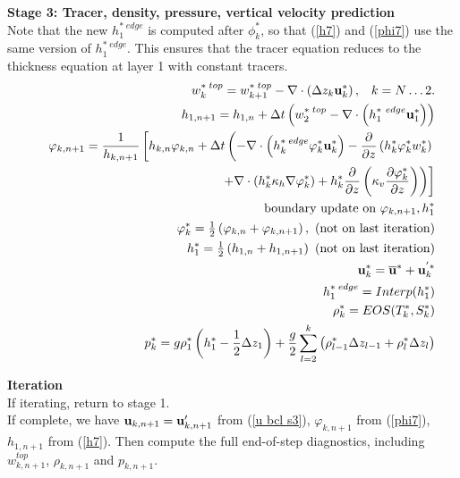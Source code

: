 \documentclass[11pt]{report}
\begin{document}
{\bf Stage 3: Tracer, density, pressure, vertical velocity prediction} \\
Note that the new $h_1^{*\; edge}$ is computed after $\phi^*_k$, so that (\ref{h7}) and (\ref{phi7}) use the same version of $h_1^{*\; edge}$.  This ensures that the tracer equation reduces to the thickness equation at layer 1 with constant tracers.
\begin{eqnarray}   &&
\label{w7}
w^{*\; top}_k 
= w^{*\; top}_{k+1} 
- \nabla \cdot \left( \Delta z_k {\bf u}^{*}_k \right), \;\;\; k=N\ldots 2.
\\&&
\label{h7}
h_{1,n+1} 
= h_{1,n} + \Delta t \left( w^{*\; top}_2     
- \nabla \cdot \left( h^{*\ edge}_1 {\bf u}^*_1 \right) \right)
\\&&
\label{phi7}
{\varphi}_{k,n+1} = \frac{1}{h_{k,n+1}} \left[
h_{k,n} \varphi_{k,n} 
+ \Delta t
\left(  - \nabla \cdot \left( h_k^{*\; edge}\varphi_k^* {\bf u}_k^* \right)  
- \frac{\partial}{\partial z} \left( h_k^*\varphi_k^* w_k^* \right)  
\right.\right.
\\&& \nonumber \hspace{5cm}
\left.\left.
+ \nabla\cdot\left(h_k^* \kappa_h \nabla\varphi_k^* \right)
+ h_k^* \frac{\partial }{\partial z} 
  \left( \kappa_v \frac{\partial \varphi_k^*}{\partial z} \right)
\right) \right]
\\&&
\mbox{boundary update on }{\varphi}_{k,n+1}, h_1^* 
\\&&
\varphi_{k}^* = \textstyle\frac{1}{2}\left(\varphi_{k,n} +\varphi_{k,n+1}\right), 
\mbox{ (not on last iteration)}
\\&&
h_{1}^* = \textstyle\frac{1}{2}\left(h_{1,n} +h_{1,n+1}\right) 
\mbox{ (not on last iteration)}
\\&&
{\bf u}^*_k = \ubtr^* + {\bf u}^{'*}_k 
\\&&
h^{*\; edge}_1 = Interp(h^*_1)
\\&& \label{rho7}
{\rho}_k^* = EOS(T^*_k, S^*_k) 
\\&&
\label{p7}
{p}_k^* =  g {\rho}_1^* \left( h_1^* - \frac{1}{2}\Delta z_1 \right) + 
  \frac{g}{2}\sum_{l=2}^{k} 
\left({\rho}_{l-1}^* \Delta z_{l-1}
+ {\rho}_{l}^* \Delta z_{l} 
\right)
\end{eqnarray}

{\bf Iteration} \\
If iterating, return to stage 1.  \\
If complete, we have ${\bf u}_{k,n+1}= {\bf u}'_{k,n+1}$ from (\ref{u bcl s3}), 
${\varphi}_{k,n+1}$ from (\ref{phi7}), $h_{1,n+1}$ from (\ref{h7}).  
Then compute the full end-of-step diagnostics, including $w^{top }_{k,n+1}$, $\rho_{k,n+1}$ and $p_{k,n+1}$.
\end{document}
